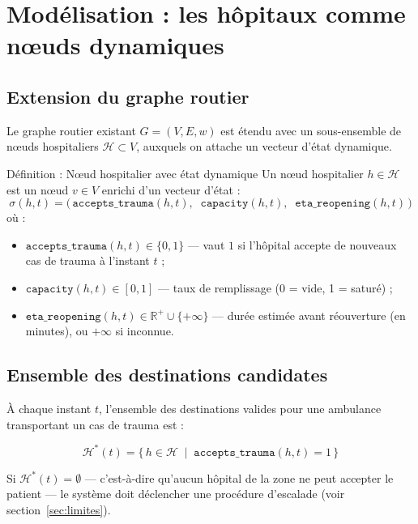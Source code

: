 \documentclass[12pt,a4paper]{article}
\theoremstyle{definition}
\theoremstyle{remark}
\begin{document}
\newpage

\section{Modélisation : les hôpitaux comme nœuds dynamiques}

\subsection{Extension du graphe routier}

Le graphe routier existant $G = (V, E, w)$ est étendu avec un sous-ensemble
de nœuds hospitaliers $\mathcal{H} \subset V$, auxquels on attache un
vecteur d'état dynamique.

\begin{defbox}{Définition : Nœud hospitalier avec état dynamique}
Un nœud hospitalier $h \in \mathcal{H}$ est un nœud $v \in V$ enrichi
d'un vecteur d'état :
\[
  \sigma(h, t) =
  \bigl(\,
    \texttt{accepts\_trauma}(h,t),\;\;
    \texttt{capacity}(h,t),\;\;
    \texttt{eta\_reopening}(h,t)
  \,\bigr)
\]
où :
\begin{itemize}[leftmargin=1.5em]
  \item $\texttt{accepts\_trauma}(h,t) \in \{0, 1\}$ — vaut $1$ si l'hôpital
    accepte de nouveaux cas de trauma à l'instant $t$ ;
  \item $\texttt{capacity}(h,t) \in [0, 1]$ — taux de remplissage (0 = vide,
    1 = saturé) ;
  \item $\texttt{eta\_reopening}(h,t) \in \mathbb{R}^+ \cup \{+\infty\}$ —
    durée estimée avant réouverture (en minutes), ou $+\infty$ si inconnue.
\end{itemize}
\end{defbox}

\subsection{Ensemble des destinations candidates}

À chaque instant $t$, l'ensemble des destinations valides pour une
ambulance transportant un cas de trauma est :

\[
  \mathcal{H}^*(t) = \bigl\{\, h \in \mathcal{H}
    \;\mid\; \texttt{accepts\_trauma}(h,t) = 1 \,\bigr\}
\]

Si $\mathcal{H}^*(t) = \emptyset$ — c'est-à-dire qu'aucun hôpital
de la zone ne peut accepter le patient — le système doit déclencher
une procédure d'escalade (voir section~\ref{sec:limites}).
\end{document}
